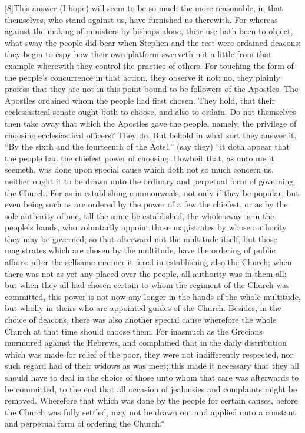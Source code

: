 [8]This answer (I hope) will seem to be so much the more reasonable, in that themselves, who stand against us, have furnished us therewith. For whereas against the making of ministers by bishops alone, their use hath been to object, what sway the people did bear when Stephen and the rest were ordained deacons; they begin to espy how their own platform swerveth not a little from that example wherewith they control the practice of others. For touching the form of the people’s concurrence in that action, they observe it not; no, they plainly profess that they are not in this point bound to be followers of the Apostles. The Apostles ordained whom the people had first chosen. They hold, that their ecclesiastical senate ought both to choose, and also to ordain. Do not themselves then take away that which the Apostles gave the people, namely, the privilege of choosing ecclesiastical officers? They do. But behold in what sort they answer it. “By the sixth and the fourteenth of the Acts1” (say they) “it doth appear that the people had the chiefest power of choosing. Howbeit that, as unto me it seemeth, was done upon special cause which doth not so much concern us, neither ought it  to be drawn unto the ordinary and perpetual form of governing the Church. For as in establishing commonweals, not only if they be popular, but even being such as are ordered by the power of a few the chiefest, or as by the sole authority of one, till the same be established, the whole sway is in the people’s hands, who voluntarily appoint those magistrates by whose authority they may be governed; so that afterward not the multitude itself, but those magistrates which are chosen by the multitude, have the ordering of public affairs: after the selfsame manner it fared in establishing also the Church; when there was not as yet any placed over the people, all authority was in them all; but when they all had chosen certain to whom the regiment of the Church was committed, this power is not now any longer in the hands of the whole multitude, but wholly in theirs who are appointed guides of the Church. Besides, in the choice of deacons, there was also another special cause wherefore the whole Church at that time should choose them. For inasmuch as the Grecians murmured against the Hebrews, and complained that in the daily distribution which was made for relief of the poor, they were not indifferently respected, nor such regard had of their widows as was meet; this made it necessary that they all should have to deal in the choice of those unto whom that care was afterwards to be committed, to the end that all occasion of jealousies and complaints might be removed. Wherefore that which was done by the people for certain causes, before the Church was fully settled, may not be drawn out and applied unto a constant and perpetual form of ordering the Church.”

